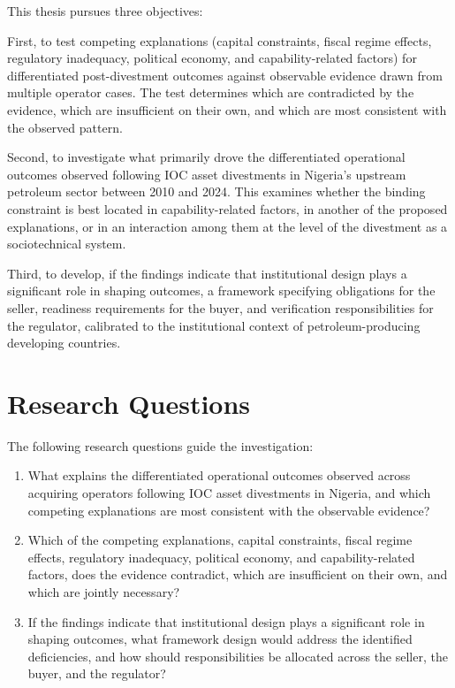 This thesis pursues three objectives:

First, to test competing explanations (capital constraints, fiscal
regime effects, regulatory inadequacy, political economy, and
capability-related factors) for differentiated post-divestment outcomes
against observable evidence drawn from multiple operator cases. The test
determines which are contradicted by the evidence, which are
insufficient on their own, and which are most consistent with the
observed pattern.

Second, to investigate what primarily drove the differentiated
operational outcomes observed following IOC asset divestments in
Nigeria's upstream petroleum sector between 2010 and 2024. This examines
whether the binding constraint is best located in capability-related
factors, in another of the proposed explanations, or in an interaction
among them at the level of the divestment as a sociotechnical system.

Third, to develop, if the findings indicate that institutional design
plays a significant role in shaping outcomes, a framework specifying
obligations for the seller, readiness requirements for the buyer, and
verification responsibilities for the regulator, calibrated to the
institutional context of petroleum-producing developing countries.

\hypertarget{research-questions}{%
\section{Research Questions}\label{research-questions}}

The following research questions guide the investigation:

\begin{enumerate}
\def\labelenumi{\arabic{enumi}.}
\item
  What explains the differentiated operational outcomes observed across
  acquiring operators following IOC asset divestments in Nigeria, and
  which competing explanations are most consistent with the observable
  evidence?
\item
  Which of the competing explanations, capital constraints, fiscal
  regime effects, regulatory inadequacy, political economy, and
  capability-related factors, does the evidence contradict, which are
  insufficient on their own, and which are jointly necessary?
\item
  If the findings indicate that institutional design plays a significant
  role in shaping outcomes, what framework design would address the
  identified deficiencies, and how should responsibilities be allocated
  across the seller, the buyer, and the regulator?
\end{enumerate}

